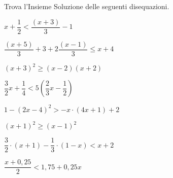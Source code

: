 \begin{esercizio}[\Ast]
 \label{ese:21.14}
Trova l'Insieme Soluzione delle seguenti disequazioni.
 \begin{multicols}{2}
 \begin{enumeratea}
 \item $x+\dfrac{1}{2}<\dfrac{(x+3)}{3}-1$
\item $\dfrac{(x+5)}{3}+3+2\dfrac{(x-1)}{3}\le x+4$
\item $(x+3)^{2}\ge (x-2)(x+2)$
\item $\dfrac{3}{2}x+\dfrac{1}{4}<5\left(\dfrac{2}{3}x-\dfrac{1}{2}\right)$
\item $1-(2x-4)^{2}>-x\cdot (4x+1)+2$
\item $(x+1)^{2}\ge (x-1)^{2}$
\item $\dfrac{3}{2}\cdot (x+1)-\dfrac{1}{3}\cdot (1-x)<x+2$
\item $\dfrac{x+0,25}{2}<1,75+0,25x$
\end{enumeratea}
\end{multicols}
\end{esercizio}

